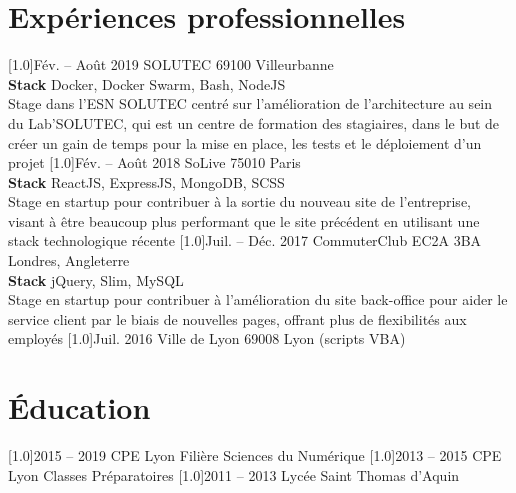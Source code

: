 \documentclass[french]{cv-style}          %
\begin{document}
\section{Expériences professionnelles}
\begin{entrylist}
\vspace{0.5cm}
\entry
  {\scalebox{.8}[1.0]{Fév. -- Août 2019}}
  {SOLUTEC}
  {69100 Villeurbanne}
  {\\
  \textbf{Stack} Docker, Docker Swarm, Bash, NodeJS\\
  Stage dans l'ESN SOLUTEC centré sur l'amélioration de l'architecture au sein du Lab'SOLUTEC, qui est un centre de formation des stagiaires,
  dans le but de créer un gain de temps pour la mise en place, les tests et le déploiement d'un projet}
\vspace{0.5cm}
\entry
  {\scalebox{.8}[1.0]{Fév. -- Août 2018}}
  {SoLive}
  {75010 Paris}
  {\\
  \textbf{Stack} ReactJS, ExpressJS, MongoDB, SCSS\\
  Stage en startup pour contribuer à la sortie du nouveau site de l'entreprise, visant à être beaucoup plus performant que le site précédent
  en utilisant une stack technologique récente}
\vspace{0.5cm}
\entry
  {\scalebox{.8}[1.0]{Juil. -- Déc. 2017}}
  {CommuterClub}
  {EC2A 3BA Londres, Angleterre}
  {\\
  \textbf{Stack} jQuery, Slim, MySQL\\
  Stage en startup pour contribuer à l'amélioration du site back-office pour aider le service client par le biais de nouvelles pages, offrant plus de flexibilités aux employés}
\entry
  {\scalebox{.8}[1.0]{Juil. 2016}}
  {Ville de Lyon}
  {69008 Lyon}
  {(scripts VBA)}
 
\end{entrylist}

\section{Éducation}
\begin{entrylist}
\vspace{0.5cm}
\entry
  {\scalebox{.8}[1.0]{2015 -- 2019}}
  {CPE Lyon}
  {}
  {Filière Sciences du Numérique}
\vspace{0.5cm}
\entry
  {\scalebox{.8}[1.0]{2013 -- 2015}}
  {CPE Lyon}
  {}
  {Classes Préparatoires}
\entry
  {\scalebox{.8}[1.0]{2011 -- 2013}}
  {Lycée Saint Thomas d'Aquin}
  {}
  {}
 
\end{entrylist}
\end{document}
